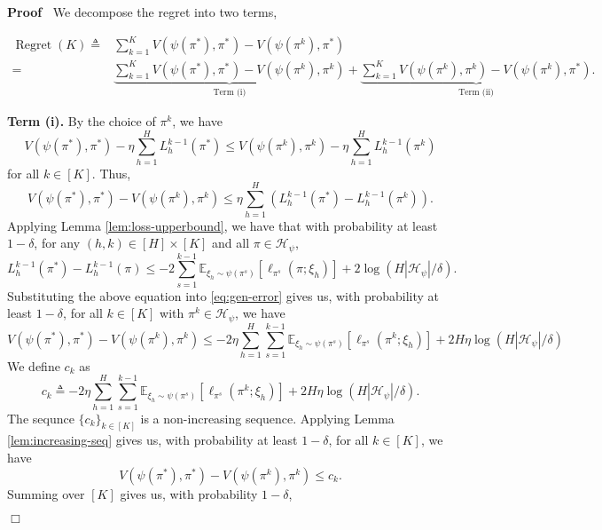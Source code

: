 \documentclass{article}
\newcommand{\tmop}[1]{\ensuremath{\operatorname{#1}}}
\newenvironment{proof}{\noindent\textbf{Proof\ }}{\hspace*{\fill}$\Box$\medskip}
\begin{document}
\begin{proof}
  We decompose the regret into two terms,
  
  \begin{align}
    \tmop{Regret} (K) \triangleq & {\sum_{k = 1}^K}  V \left( \psi
    (\pi^{\ast}) {, \pi^{\ast}}^{} \right) - V (\psi (\pi^k), \pi^{\ast})
    \nonumber\\
    = & \underbrace{\sum_{k = 1}^K V \left( \psi (\pi^{\ast}) {,
    \pi^{\ast}}^{} \right) - V (\psi (\pi^k), \pi^k)}_{\text{Term (i)} } +
    \underbrace{\sum_{k = 1}^K V (\psi (\pi^k), \pi^k) - V (\psi (\pi^k),
    \pi^{\ast})}_{\text{Term  (ii)}} . \nonumber
  \end{align}
  
  \textbf{Term (i).} By the choice of $\pi^k$, we have
  \[ V (\psi (\pi^{\ast}), \pi^{\ast}) - \eta \sum_{h = 1}^H L_h^{k - 1}
     (\pi^{\ast}) \leq V (\psi (\pi^k), \pi^k) - \eta \sum_{h = 1}^H L_h^{k -
     1} (\pi^k) \]
  for all $k \in [K]$. Thus,
  \begin{equation}
    V (\psi (\pi^{\ast}), \pi^{\ast}) - V (\psi (\pi^k), \pi^k) \leq \eta
    \sum_{h = 1}^H (L_h^{k - 1} (\pi^{\ast}) - L_h^{k - 1} (\pi^k)) .
    \label{eq:gen-error}
  \end{equation}
  Applying Lemma \ref{lem:loss-upperbound}, we have that with probability at
  least $1 - \delta$, for any $(h, k) \in [H] \times [K]$ and all $\pi \in
  \mathcal{H}_{\psi}$,
  \[ L_h^{k - 1} (\pi^{\ast}) - L_h^{k - 1} (\pi) \leq - 2 \sum_{s = 1}^{k -
     1} \mathbb{E}_{\xi_h \sim \psi (\pi^s)} [\ell_{\pi^s} (\pi ; \xi_h)] + 2
     \log (H | \mathcal{H}_{\psi} | / \delta) . \]
  Substituting the above equation into \eqref{eq:gen-error} gives us, with
  probability at least $1 - \delta$, for all $k \in [K]$ with $\pi^k \in
  \mathcal{H}_{\psi}$, we have
  \[ V (\psi (\pi^{\ast}), \pi^{\ast}) - V (\psi (\pi^k), \pi^k) \leq - 2 \eta
     \sum_{h = 1}^H \sum_{s = 1}^{k - 1} \mathbb{E}_{\xi_h \sim \psi (\pi^s)}
     [\ell_{\pi^s} (\pi^k ; \xi_h)] + 2 H \eta \log (H | \mathcal{H}_{\psi} |
     / \delta) \]
  We define $c_k$ as
  \[ c_k \triangleq - 2 \eta \sum_{h = 1}^H \sum_{s = 1}^{k - 1}
     \mathbb{E}_{\xi_h \sim \psi (\pi^s)} [\ell_{\pi^s} (\pi^k ; \xi_h)] + 2 H
     \eta \log (H | \mathcal{H}_{\psi} | / \delta) . \]
  The sequnce $\{ c_k \}_{k \in [K]}$ is a non-increasing sequence. Applying
  Lemma \ref{lem:increasing-seq} gives us, with probability at least $1 -
  \delta$, for all $k \in [K]$, we have
  \[ V (\psi (\pi^{\ast}), \pi^{\ast}) - V (\psi (\pi^k), \pi^k) \leq c_k .
  \]
  Summing over $[K]$ gives us, with probability $1 - \delta$,
  

\end{proof}
\end{document}
